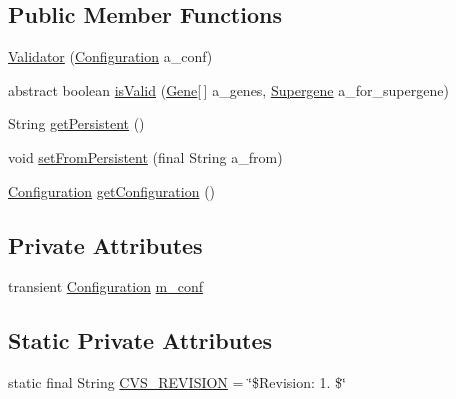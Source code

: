 \subsection*{Public Member Functions}
\begin{DoxyCompactItemize}
\item 
\hyperlink{classorg_1_1jgap_1_1supergenes_1_1_validator_ab2a21a58bd8d93e5f8482c7491a832c1}{Validator} (\hyperlink{classorg_1_1jgap_1_1_configuration}{Configuration} a\-\_\-conf)
\item 
abstract boolean \hyperlink{classorg_1_1jgap_1_1supergenes_1_1_validator_a8f5b2697943140ed0647bbcda7911939}{is\-Valid} (\hyperlink{interfaceorg_1_1jgap_1_1_gene}{Gene}\mbox{[}$\,$\mbox{]} a\-\_\-genes, \hyperlink{interfaceorg_1_1jgap_1_1supergenes_1_1_supergene}{Supergene} a\-\_\-for\-\_\-supergene)
\item 
String \hyperlink{classorg_1_1jgap_1_1supergenes_1_1_validator_af65e5cad1eef911e6a5b97e4fbeaf130}{get\-Persistent} ()
\item 
void \hyperlink{classorg_1_1jgap_1_1supergenes_1_1_validator_a3991869273aa8d499ecf213ae138d7d1}{set\-From\-Persistent} (final String a\-\_\-from)
\item 
\hyperlink{classorg_1_1jgap_1_1_configuration}{Configuration} \hyperlink{classorg_1_1jgap_1_1supergenes_1_1_validator_a88d0ab4164171334e4430a3b3e21bce3}{get\-Configuration} ()
\end{DoxyCompactItemize}
\subsection*{Private Attributes}
\begin{DoxyCompactItemize}
\item 
transient \hyperlink{classorg_1_1jgap_1_1_configuration}{Configuration} \hyperlink{classorg_1_1jgap_1_1supergenes_1_1_validator_af42bcaebed258b484e7e6b8d4fe2d10e}{m\-\_\-conf}
\end{DoxyCompactItemize}
\subsection*{Static Private Attributes}
\begin{DoxyCompactItemize}
\item 
static final String \hyperlink{classorg_1_1jgap_1_1supergenes_1_1_validator_a2b3e3502cd91529026dd99e0aa3ddf78}{C\-V\-S\-\_\-\-R\-E\-V\-I\-S\-I\-O\-N} = \char`\"{}\$Revision\-: 1. \$\char`\"{}
\end{DoxyCompactItemize}
